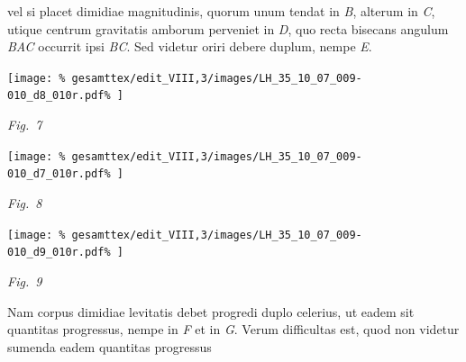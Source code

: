 %
%
vel si placet dimidiae magnitudinis,%
\protect{}
quorum unum tendat in \textit{B},
alterum in \textit{C},
utique centrum gravitatis%
\protect{}
amborum perveniet in \textit{D},
quo recta bisecans angulum \textit{BAC}%
\protect{}%
\protect{}
occurrit ipsi \textit{BC}.
Sed videtur oriri debere duplum,
nempe \textit{E}.
\pend%
%
\vspace{2.5em} %
\centerline{%
\hspace{-95mm}%
\texttt{[image: \%
gesamttex/edit\_VIII,3/images/LH\_35\_10\_07\_009-010\_d8\_010r.pdf\%
]}}
\vspace{0.5em}
\centerline{%
\hspace{-95mm}%
\lbrack\textit{Fig.~7}\rbrack%
\label{LH_35_10_07_010r_Fig.7}%
}
%
%
\vspace{-9.5em} %
\centerline{%
\hspace{5mm}%
\texttt{[image: \%
gesamttex/edit\_VIII,3/images/LH\_35\_10\_07\_009-010\_d7\_010r.pdf\%
]}}%
\vspace{0.25em}
\centerline{%
\hspace{5mm}%
\lbrack\textit{Fig.~8}\rbrack%
\label{LH_35_10_07_010r_Fig.8}%
}%
%
\vspace{-13.2em} %
\centerline{%
\hspace{100mm}%
\texttt{[image: \%
gesamttex/edit\_VIII,3/images/LH\_35\_10\_07\_009-010\_d9\_010r.pdf\%
]}}
\vspace{0.0em}
\centerline{%
\hspace{100mm}%
\lbrack\textit{Fig.~9}\rbrack%
\label{LH_35_10_07_010r_Fig.9}%
}
\newpage%
%
\pstart%
Nam corpus dimidiae levitatis%
\protect{}
debet progredi duplo celerius,
ut eadem sit quantitas progressus,%
\protect{}
nempe in \textit{F} et in \textit{G}.
Verum difficultas est,%
\protect{}
quod non videtur sumenda eadem quantitas progressus%
